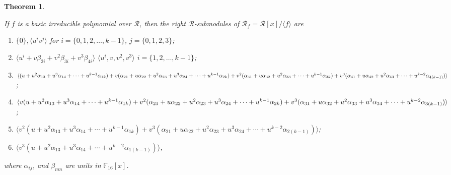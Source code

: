 \documentclass{amsart}
\newtheorem{theorem}{Theorem}[section]
\theoremstyle{definition}
\theoremstyle{remark}
\numberwithin{equation}{section}
\begin{document}
   \begin{theorem}\label{th2}
   
        If $f$ is a basic irreducible polynomial over $\mathcal{R}$, then the right $\mathcal{R}$-submodules of $\mathcal{R}_f=\mathcal{R}[x]/ \langle f\rangle$ are
        \begin{enumerate}
        
        \item $\{0\},  \langle u^iv^j\rangle$ for $i = \{0,1,2,\dots,k-1\}$, $j = \{0,1,2,3\}$;
        
        \item $ \langle u^i + v\beta_{2i} + v^2\beta_{3i} + v^3\beta_{4i}\rangle$  $ \langle u^i , v , v^2 , v^3 \rangle $   $i = \{1,2,\dots,k-1\}$;
        
        \item $\langle (u + u^2\alpha_{13} + u^3\alpha_{14} + \cdots + u^{k-1}\alpha_{1k})
        + v( \alpha_{21} + u\alpha_{22} + u^2\alpha_{23} + u^3\alpha_{24} + \cdots + u^{k-1}\alpha_{2k} )\\
        + v^2(  \alpha_{31} + u\alpha_{32} + u^2\alpha_{33}  + \cdots + u^{k-1}\alpha_{3k} )
        + v^3( \alpha_{41} + u\alpha_{42} + u^2\alpha_{43}  + \cdots + u^{k-2}\alpha_{4(k-1)} )\rangle   $;
        
        \item $ \langle v( u + u^2\alpha_{13} + u^3\alpha_{14} + \cdots + u^{k-1}\alpha_{1k} )
        + v^2(  \alpha_{21} + u\alpha_{22} + u^2\alpha_{23} + u^3\alpha_{24} + \cdots + u^{k-1}\alpha_{2k} )\\
        + v^3( \alpha_{31} + u\alpha_{32} + u^2\alpha_{33} + u^3\alpha_{34} + \cdots + u^{k-2}\alpha_{3(k-1)} )\rangle  $;
        
        \item $ \langle v^2(  u + u^2\alpha_{13} + u^3\alpha_{14} + \cdots + u^{k-1}\alpha_{1k} )
        + v^3( \alpha_{21} + u\alpha_{22} + u^2\alpha_{23} + u^3\alpha_{24} + \cdots + u^{k-2}\alpha_{2(k-1)} )\rangle  $;
        
        \item $ \langle  v^3( u + u^2\alpha_{13} + u^3\alpha_{14} + \cdots + u^{k-2}\alpha_{1(k-1)} )\rangle  $,
        
        \end{enumerate}
        where $\alpha_{ij} $, and $\beta_{mn}$ are units in $\mathbb F_{16}[x]$.
	\end{theorem}
    
\end{document}
